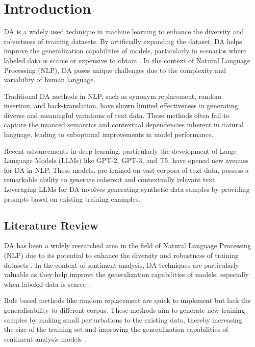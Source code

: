 \documentclass{article}
\begin{document}
\section{Introduction}

DA is a widely used technique in machine learning to enhance the diversity and
robustness of training datasets. By artificially expanding the dataset, DA
helps improve the generalization capabilities of models, particularly in
scenarios where labeled data is scarce or expensive to obtain
\cite{DBLP:journals/corr/abs-2105-03075}. In the context of Natural Language
Processing (NLP), DA poses unique challenges due to the complexity and
variability of human language.

Traditional DA methods in NLP, such as synonym replacement, random insertion,
and back-translation, have shown limited effectiveness in generating diverse
and meaningful variations of text data. These methods often fail to capture the
nuanced semantics and contextual dependencies inherent in natural language,
leading to suboptimal improvements in model performance.

Recent advancements in deep learning, particularly the development of Large
Language Models (LLMs) like GPT-2, GPT-3, and T5, have opened new avenues for
DA in NLP. These models, pre-trained on vast corpora of text data, possess a
remarkable ability to generate coherent and contextually relevant text.
Leveraging LLMs for DA involves generating synthetic data samples by providing
prompts based on existing training examples.

\subsection{Literature Review}

DA has been a widely researched area in the field of Natural Language
Processing (NLP) due to its potential to enhance the diversity and robustness
of training datasets \cite{DBLP:journals/corr/abs-2105-03075}. In the context
of sentiment analysis, DA techniques are particularly valuable as they help
improve the generalization capabilities of models, especially when labeled data
is scarce \cite{li-specia-2019-improving}.

Rule based methods like random replacement are quick to implement but lack the
generalisability to different corpus. These methods aim to generate new
training samples by making small perturbations to the existing data, thereby
increasing the size of the training set and improving the generalization
capabilities of sentiment analysis models \cite{wei-zou-2019-eda}.
\end{document}
